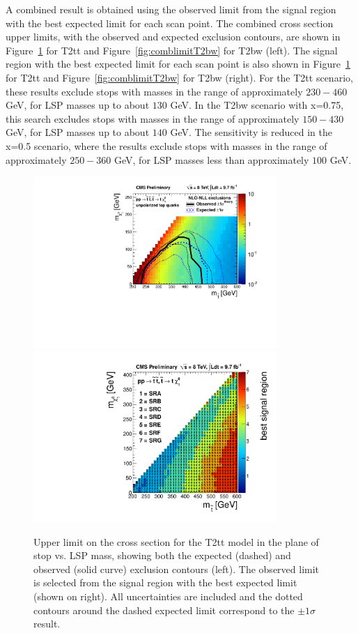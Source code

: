 A combined result is obtained using the observed limit from the signal
region with the best expected limit for each scan point. The combined cross
section upper limits, with the observed and expected exclusion contours, are
shown in Figure~\ref{fig:comblimit} for T2tt and 
Figure~\ref{fig:comblimitT2bw} for T2bw (left).
The signal region with the best expected limit for each scan point is
also shown in Figure~\ref{fig:comblimit} for T2tt and 
Figure~\ref{fig:comblimitT2bw} for T2bw (right). 
For the T2tt scenario, these results exclude stops with masses
in the range of approximately $230-460$ GeV, for LSP masses up to about
$130$ GeV. In the T2bw scenario with x=0.75, this search excludes
stops with masses in the range of approximately $150-430$ GeV, for LSP
masses up to about $140$ GeV. The sensitivity is reduced in the
x=0.5 scenario, where the results exclude stops with masses in the
range of approximately $250-360$ GeV, for LSP masses less than
approximately $100$ GeV.

 \begin{figure}[hbt]
  \begin{center}
       \includegraphics[height=6.5cm]{plots/combinePlots_T2tt.pdf}%
       \includegraphics[height=6.5cm]{plots/combinePlots_T2tt_bestSignalRegion.pdf}
    \caption{Upper limit on the cross section for the T2tt model in
      the plane of stop vs. LSP mass, showing
      both the expected (dashed) and observed (solid curve) exclusion
      contours (left). The observed
      limit is selected from the signal region with the best expected
      limit (shown on right). All uncertainties are included and the
      dotted contours around the dashed expected limit correspond to
      the $\pm 1\sigma$ result.}
\label{fig:comblimit}
      \end{center}
\end{figure}

